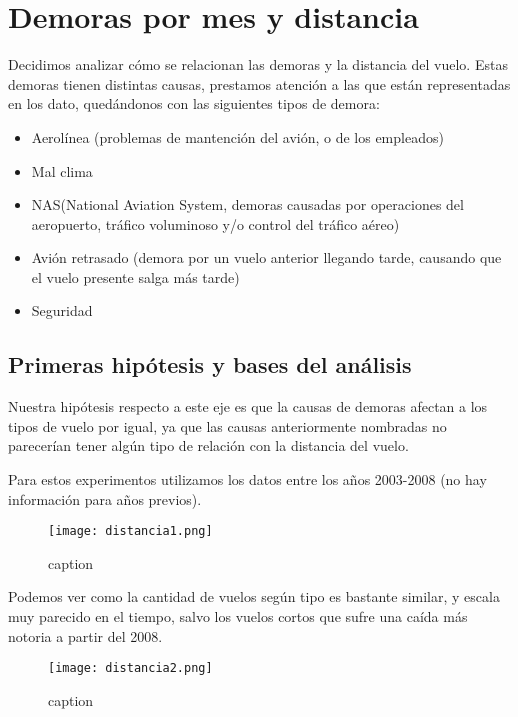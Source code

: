 \section{Demoras por mes y distancia}

Decidimos analizar cómo se relacionan las demoras y la distancia del vuelo. Estas demoras tienen distintas causas, prestamos atención a las que están representadas en los dato, quedándonos con las siguientes tipos de demora:
\begin{itemize}
\item Aerolínea (problemas de mantención del avión, o de los empleados)
\item Mal clima
\item NAS(National Aviation System, demoras causadas por operaciones del aeropuerto, tráfico voluminoso y/o control del tráfico aéreo)
\item Avión retrasado (demora por un vuelo anterior llegando tarde, causando que el vuelo presente salga más tarde)
\item Seguridad
\end{itemize}

\subsection{Primeras hipótesis y bases del análisis}

Nuestra hipótesis respecto a este eje es que la causas de demoras afectan a los tipos de vuelo por igual, ya que las causas anteriormente nombradas no parecerían tener algún tipo de relación con la distancia del vuelo.

Para estos experimentos utilizamos los datos entre los años 2003-2008 (no hay información para años previos). 

\begin{figure}[!htb]
\begin{center}
\texttt{[image: distancia1.png]}
\caption{caption}
\label{label}
\end{center}
\end{figure}

Podemos ver como la cantidad de vuelos según tipo es bastante similar, y escala muy parecido en el tiempo, salvo los vuelos cortos que sufre una caída más notoria a partir del 2008.

\begin{figure}[!htb]
\begin{center}
\texttt{[image: distancia2.png]}
\caption{caption}
\label{label}
\end{center}
\end{figure}

